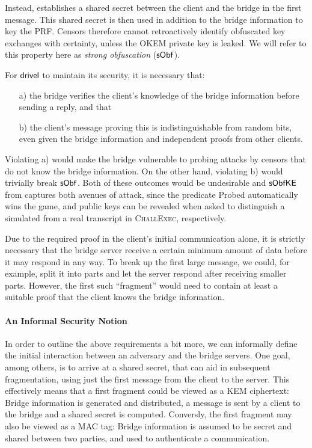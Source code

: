 Instead, \drivel{} establishes a shared secret between the client and the bridge in the first message. This shared secret is then used in addition to the bridge information to key the PRF. Censors therefore cannot retroactively identify obfuscated key exchanges with certainty, unless the OKEM private key is leaked. We will refer to this property here as \emph{strong obfuscation} ($\mathsf{sObf}$).

For $\textsf{drivel}$ to maintain its security, it is necessary that:
\begin{itemize}
    \item[a)] the bridge verifies the client's knowledge of the bridge information before sending a reply, and that
    \item[b)] the client's message proving this is indistinguishable from random bits, even given the bridge information and independent proofs from other clients.
\end{itemize}

Violating a) would make the bridge vulnerable to probing attacks by censors that do not know the bridge information. On the other hand, violating b) would trivially break $\mathsf{sObf}$. Both of these outcomes would be undesirable and $\mathsf{sObfKE}$ from \cite{CCS:GunSteVei24} captures both avenues of attack, since the predicate \textsf{Probed} automatically wins the game, and public keys can be revealed when asked to distinguish a simulated from a real transcript in \textsc{ChallExec}, respectively.

Due to the required proof in the client's initial communication alone, it is strictly necessary that the bridge server receive a certain minimum amount of data before it may respond in any way.
To break up the first large \drivel{} message, we could, for example, split it into parts and let the server respond after receiving smaller parts. However, the first such ``fragment'' would need to contain at least a suitable proof that the client knows the bridge information.

\paragraph{An Informal Security Notion}
In order to outline the above requirements a bit more, we can informally define the initial interaction between an adversary and the bridge servers. One goal, among others, is to arrive at a shared secret, that can aid in subsequent fragmentation, using just the first message from the client to the server.
This effectively means that a first fragment could be viewed as a KEM ciphertext: Bridge information is generated and distributed, a message is sent by a client to the bridge and a shared secret is computed. Conversly, the first fragment may also be viewed as a MAC tag: Bridge information is assumed to be secret and shared between two parties, and used to authenticate a communication.

